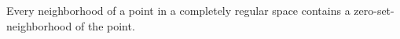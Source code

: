 Every neighborhood of a point in a completely regular space contains a zero-set-neighborhood of the point.
